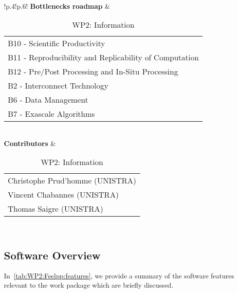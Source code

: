 \begin{table}[!ht]
{{\begin{tabular}{!{\color{numpexgray}\vrule}p{.4\textwidth}!{\color{numpexgray}\vrule}p{.6\textwidth}!{\color{numpexgray}\vrule}}
        \textbf{Bottlenecks roadmap} & \begin{tabular}{l}
B10 - Scientific Productivity\\
B11 - Reproducibility and Replicability of Computation\\
B12 - Pre/Post Processing and In-Situ Processing\\
B2 - Interconnect Technology\\
B6 - Data Management\\
B7 - Exascale Algorithms\\
\end{tabular} \\
\textbf{Contributors} & \begin{tabular}{l}
    Christophe Prud'homme (UNISTRA)\\
    Vincent Chabannes (UNISTRA)\\
    Thomas Saigre (UNISTRA)\\
\end{tabular}\\
        \hline
    \end{tabular}
    }}
    \caption{WP2: \Feelpp Information}
\end{table}

\subsection{Software Overview}
\label{sec:WP2:Feelpp:summary}

In~\cref{tab:WP2:Feelpp:features}, we provide a summary of the software features relevant to the work package which are briefly discussed.

